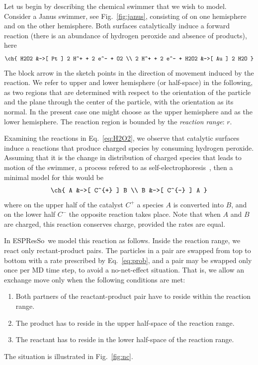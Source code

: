\documentclass[aip,jcp,reprint,a4paper,onecolumn,nofootinbib,amsmath,amssymb]{revtex4-1}
\newcommand{\es}{\mbox{\textsf{ESPResSo}}\xspace}
\begin{document}
Let us begin by describing the chemical swimmer that we wish to model. Consider a Janus swimmer, see Fig.~\ref{fig:janus}, consisting of  on one hemisphere and  on the other hemisphere. Both surfaces catalytically induce a forward reaction (there is an abundance of hydrogen peroxide and absence of products), here~\cite{Gibbs_10,Wheat_10}
\begin{align}
  \label{eq:H2O2}
  \ch{
    H2O2 &->[ Pt ] 2 H^+ + 2 e^- + O2 \\
    2 H^+ + 2 e^- + H2O2 &->[ Au ] 2 H2O
  }
\end{align}
The block arrow in the sketch points in the direction of movement induced by the reaction. We refer to upper and lower hemisphere (or half-space) in the following, as two regions that are determined with respect to the orientation of the particle and the plane through the center of the particle, with the orientation as its normal. In the present case one might choose  as the upper hemisphere and  as the lower hemisphere. The reaction region is bounded by the \textit{reaction range}: $r$.

Examining the reactions in Eq.~\eqref{eq:H2O2}, we observe that catalytic surfaces induce a reactions that produce charged species by consuming hydrogen peroxide. Assuming that it is the change in distribution of charged species that leads to motion of the swimmer, a process refered to as self-electrophoresis~\cite{Gibbs_10,Wheat_10}, then a minimal model for this would be 
\begin{align}
  \label{eq:simple}
  \ch{
    A &->[ C^{+} ] B \\
    B &->[ C^{-} ] A 
  }
\end{align}
where on the upper half of the catalyst $C^{+}$ a species $A$ is converted into $B$, and on the lower half $C^{-}$ the opposite reaction takes place. Note that when $A$ and $B$ are charged, this reaction conserves charge, provided the rates are equal. 

In \es\, we model this reaction as follows. Inside the reaction range, we react only rectant-product pairs. The particles in a pair are swapped from top to bottom with a rate prescribed by Eq.~\eqref{eq:prob}, and a pair may be swapped only once per MD time step, to avoid a no-net-effect situation. That is, we allow an exchange move only when the following conditions are met:
\begin{enumerate}
\item Both partners of the reactant-product pair have to reside within
  the reaction range.
\item The product has to reside in the upper half-space of the
  reaction range.
\item The reactant has to reside in the lower half-space of the
  reaction range.
\end{enumerate}
The situation is illustrated in Fig.~\ref{fig:nc}.
\end{document}
